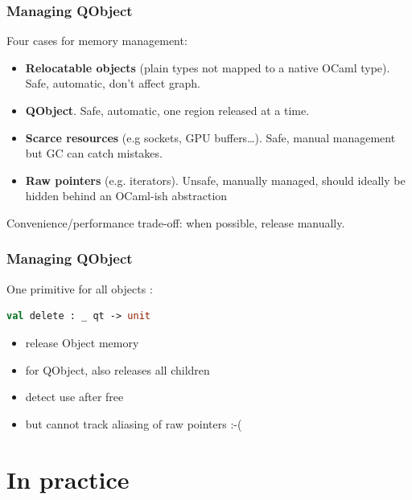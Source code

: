 \documentclass[serif,mathserif]{beamer}
\begin{document}
\begin{frame}
  \frametitle{Managing QObject}
  
  Four cases for memory management:

  \begin{itemize}
    \item {\bf Relocatable objects} (plain types not mapped to a native OCaml type).  Safe, automatic, don't affect graph. \pause
    \item {\bf QObject}.
      Safe, automatic, one region released at a time. \pause
    \item {\bf Scarce resources} (e.g sockets, GPU buffers\ldots).
      Safe, manual management but GC can catch mistakes. \pause
    \item {\bf Raw pointers} (e.g. iterators).
      Unsafe, manually managed, should ideally be hidden behind an OCaml-ish
      abstraction \pause
  \end{itemize}

  Convenience/performance trade-off: when possible, release manually.
\end{frame}

\begin{frame}[fragile]
  \frametitle{Managing QObject}

  One primitive for all objects :
  
\begin{lstlisting}[language=Caml,morekeywords={module,sig,end,val}]
val delete : _ qt -> unit
\end{lstlisting}

  \begin{itemize}
    \item release Object memory
    \item for QObject, also releases all children
    \item detect use after free
    \item but cannot track aliasing of raw pointers :-(
  \end{itemize}

\end{frame}

\section{In practice}
\end{document}
